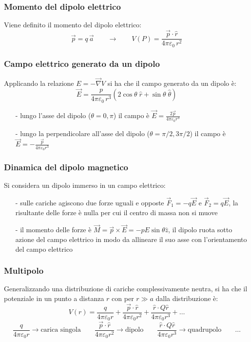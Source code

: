 \documentclass[a4paper]{article}
\newcommand\nab{\vec{\nabla}} %
\begin{document}
\subsubsection*{Momento del dipolo elettrico}
Viene definito il momento del dipolo elettrico:
\[\vec{p} = q \, \vec{a} \qquad \rightarrow \qquad V(P) = \frac{\vec{p} \cdot \hat{r}}{4 \pi \varepsilon_0 \, r^2}\]

\subsubsection*{Campo elettrico generato da un dipolo}
Applicando la relazione \(E = - \nab V\) si ha che il campo generato da un dipolo è: 
\[\vec{E} = \frac{p}{4 \pi \varepsilon_0 \, r^3} (2 \cos \theta \; \hat{r} + \sin \theta \; \hat{\theta})\]

\begin{itemize}[topsep=3pt, itemsep=0pt]
	\item[-] lungo l'asse del dipolo (\(\theta = 0, \pi\)) il campo è \(\displaystyle \vec{E} = \frac{2 \vec{p}}{4 \pi \varepsilon_0 r^3}\)
	\item[-] lungo la perpendicolare all'asse del dipolo (\(\theta = \pi/2, 3\pi/2\)) il campo è \(\displaystyle \vec{E} = -\frac{\vec{p}}{4 \pi \varepsilon_0 r^3}\)
\end{itemize}

\subsubsection*{Dinamica del dipolo magnetico}
Si considera un dipolo immerso in un campo elettrico:
\begin{itemize}[topsep=3pt, itemsep=0pt]
	\item[-] sulle cariche agiscono due forze uguali e opposte \(\vec{F}_1 = -q\vec{E}\) e \(\vec{F}_2 = q\vec{E}\), la risultante
	delle forze è nulla per cui il centro di massa non si muove
	\item[-] il momento delle forze è \(\vec{M} = \vec{p} \times \vec{E} = -p E \sin \theta \hat{z}\), il dipolo ruota sotto azione
	del campo elettrico in modo da allineare il suo asse con l'orientamento del campo elettrico
\end{itemize}

\subsubsection*{Multipolo}
Generalizzando una distribuzione di cariche complessivamente neutra, si ha che il potenziale in un punto a distanza \(r\) con per
\(r \gg a\) dalla distribuzione è:
\[V(r) = \frac{q}{4 \pi \varepsilon_0 r} + \frac{\vec{p} \cdot \hat{r}}{4 \pi \varepsilon_0 r^2} + \frac{\hat{r} \cdot Q \hat{r}}{4 \pi \varepsilon_0 r^3} + \dots\]
\[\frac{q}{4 \pi \varepsilon_0 r} \rightarrow \text{carica singola} \qquad \frac{\vec{p} \cdot \hat{r}}{4 \pi \varepsilon_0 r^2} \rightarrow \text{dipolo} \qquad \frac{\hat{r} \cdot Q \hat{r}}{4 \pi \varepsilon_0 r^3} \rightarrow \text{quadrupolo} \qquad \dots\]
\end{document}
